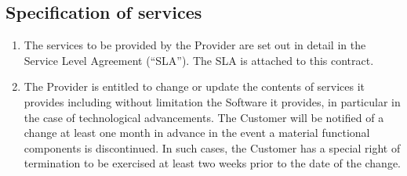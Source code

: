 \documentclass{terms}
\begin{document}
\subsection{Specification of services}
\begin{enumerate}
\item The services to be provided by the Provider are set out in detail in the Service Level Agreement (“SLA”).
      The SLA is attached to this contract.
\item The Provider is entitled to change or update the contents of services it provides including without limitation the Software it provides, in particular in the case of technological advancements.
      The Customer will be notified of a change at least one month in advance in the event a material functional components is discontinued.
      In such cases, the Customer has a special right of termination to be exercised at least two weeks prior to the date of the change.
\end{enumerate}
\end{document}
